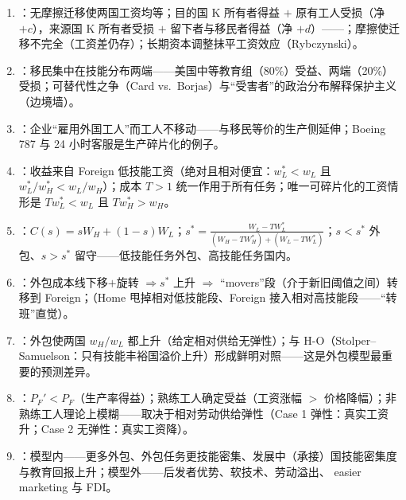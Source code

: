 \begin{sumbox}
\begin{enumerate}
  \item {}：无摩擦迁移使两国工资均等；目的国 K 所有者得益 $+$ 原有工人受损（净 $+c$），来源国 K 所有者受损 $+$ 留下者与移民者得益（净 $+d$）——；摩擦使迁移不完全（工资差仍存）；长期资本调整抹平工资效应（Rybczynski）。
  \item {}：移民集中在技能分布两端——美国中等教育组（80\%）受益、两端（20\%）受损；可替代性之争（Card vs.\ Borjas）与``受害者''的政治分布解释保护主义（边境墙）。
  \item {}：企业``雇用外国工人''而工人不移动——与移民等价的生产侧延伸；Boeing 787 与 24 小时客服是生产碎片化的例子。
  \item {}：收益来自 Foreign 低技能工资（绝对且相对便宜：$w_L^* < w_L$ 且 $w_L^*/w_H^* < w_L/w_H$）；成本 $T > 1$ 统一作用于所有任务；唯一可碎片化的工资情形是 $T w_L^* < w_L$ 且 $T w_H^* > w_H$。
  \item {}：$C(s) = sW_H + (1-s)W_L$；$s^* = \frac{W_L - TW_L^*}{(W_H - TW_H^*) + (W_L - TW_L^*)}$；$s < s^*$ 外包、$s > s^*$ 留守——低技能任务外包、高技能任务国内。
  \item {}：外包成本线下移$+$旋转 $\Rightarrow s^*$ 上升 $\Rightarrow$ ``movers''段（介于新旧阈值之间）转移到 Foreign；（Home 甩掉相对低技能段、Foreign 接入相对高技能段——``转班''直觉）。
  \item {}：外包使两国 $w_H/w_L$ 都上升（给定相对供给无弹性）；与 H-O（Stolper--Samuelson：只有技能丰裕国溢价上升）形成鲜明对照——这是外包模型最重要的预测差异。
  \item {}：$P_F' < P_F$（生产率得益）；熟练工人确定受益（工资涨幅 $>$ 价格降幅）；非熟练工人理论上模糊——取决于相对劳动供给弹性（Case 1 弹性：真实工资升；Case 2 无弹性：真实工资降）。
  \item {}：模型内——更多外包、外包任务更技能密集、发展中（承接）国技能密集度与教育回报上升；模型外——后发者优势、软技术、劳动溢出、 easier marketing 与 FDI。
\end{enumerate}
\end{sumbox}

